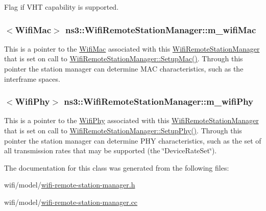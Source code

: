 Flag if V\+HT capability is supported. 

\subsubsection[{\texorpdfstring{m\+\_\+wifi\+Mac}{m_wifiMac}}]{$<${\bf Wifi\+Mac}$>$ ns3\+::\+Wifi\+Remote\+Station\+Manager\+::m\+\_\+wifi\+Mac\hspace{0.3cm}{\ttfamily [private]}}\hypertarget{classns3_1_1WifiRemoteStationManager_a8b8b990c8d21c2a5feed00f265f929ca}{}\label{classns3_1_1WifiRemoteStationManager_a8b8b990c8d21c2a5feed00f265f929ca}
This is a pointer to the \hyperlink{classns3_1_1WifiMac}{Wifi\+Mac} associated with this \hyperlink{classns3_1_1WifiRemoteStationManager}{Wifi\+Remote\+Station\+Manager} that is set on call to \hyperlink{classns3_1_1WifiRemoteStationManager_a4e9a526ceb0023999870799817a06bb2}{Wifi\+Remote\+Station\+Manager\+::\+Setup\+Mac()}. Through this pointer the station manager can determine M\+AC characteristics, such as the interframe spaces. 
\subsubsection[{\texorpdfstring{m\+\_\+wifi\+Phy}{m_wifiPhy}}]{$<${\bf Wifi\+Phy}$>$ ns3\+::\+Wifi\+Remote\+Station\+Manager\+::m\+\_\+wifi\+Phy\hspace{0.3cm}{\ttfamily [private]}}\hypertarget{classns3_1_1WifiRemoteStationManager_a68cf308f39d3af06d148dae9268b9073}{}\label{classns3_1_1WifiRemoteStationManager_a68cf308f39d3af06d148dae9268b9073}
This is a pointer to the \hyperlink{classns3_1_1WifiPhy}{Wifi\+Phy} associated with this \hyperlink{classns3_1_1WifiRemoteStationManager}{Wifi\+Remote\+Station\+Manager} that is set on call to \hyperlink{classns3_1_1WifiRemoteStationManager_a823deffface82c9fe1daa06ce11c585b}{Wifi\+Remote\+Station\+Manager\+::\+Setup\+Phy()}. Through this pointer the station manager can determine P\+HY characteristics, such as the set of all transmission rates that may be supported (the \char`\"{}\+Device\+Rate\+Set\char`\"{}). 

The documentation for this class was generated from the following files\+:\begin{DoxyCompactItemize}
\item 
wifi/model/\hyperlink{wifi-remote-station-manager_8h}{wifi-\/remote-\/station-\/manager.\+h}\item 
wifi/model/\hyperlink{wifi-remote-station-manager_8cc}{wifi-\/remote-\/station-\/manager.\+cc}\end{DoxyCompactItemize}
